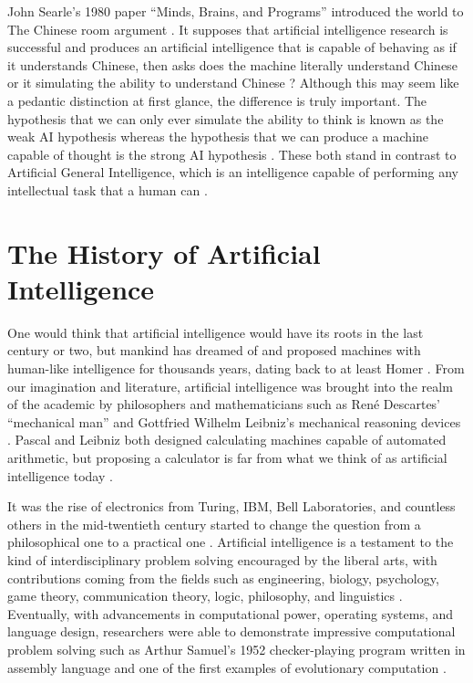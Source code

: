 \documentclass[oneside,12pt,openany]{book}
\begin{document}
	John Searle's 1980 paper ``Minds, Brains, and Programs'' introduced the world to The Chinese room argument \cite{Searle}. It supposes that artificial intelligence research is successful and produces an artificial intelligence that is capable of behaving as if it understands Chinese, then asks does the machine literally understand Chinese or it simulating the ability to understand Chinese \cite{Searle}? Although this may seem like a pedantic distinction at first glance, the difference is truly important. The hypothesis that we can only ever simulate the ability to think is known as the weak AI hypothesis whereas the hypothesis that we can produce a machine capable of thought is the strong AI hypothesis \cite{Jones}. These both stand in contrast to Artificial General Intelligence, which is an intelligence capable of performing any intellectual task that a human can \cite{Buchanan}.
	
	\section{The History of Artificial Intelligence}
	
	
	One would think that artificial intelligence would have its roots in the last century or two, but mankind has dreamed of and proposed machines with human-like intelligence for thousands years, dating back to at least Homer \cite{Buchanan}. From our imagination and literature, artificial intelligence was brought into the realm of the academic by philosophers and mathematicians such as Ren\'e Descartes' ``mechanical man'' and Gottfried Wilhelm Leibniz's mechanical reasoning devices \cite{Buchanan}. Pascal and Leibniz both designed calculating machines capable of automated arithmetic, but proposing a calculator is far from what we think of as artificial intelligence today  \cite{Buchanan}.
	
	It was the rise of electronics from Turing, IBM, Bell Laboratories, and countless others in the mid-twentieth century started to change the question from a philosophical one to a practical one \cite{Buchanan}. Artificial intelligence is a testament to the kind of interdisciplinary problem solving encouraged by the liberal arts, with contributions coming from the fields such as engineering, biology, psychology, game theory, communication theory, logic, philosophy, and linguistics \cite{Buchanan}. Eventually, with advancements in computational power, operating systems, and language design, researchers were able to demonstrate impressive  computational problem solving such as Arthur Samuel's 1952 checker-playing program written in assembly language and one of the first examples of evolutionary computation \cite{Buchanan}. 
	
\end{document}
